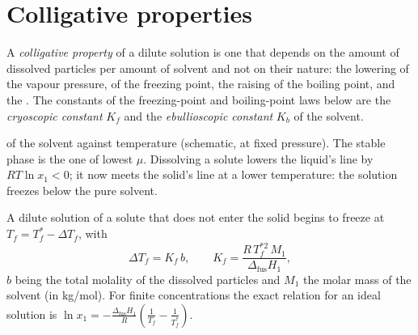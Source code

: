 \section{Colligative properties}

\begin{definition}\label{def:b2:chemical-potential:colligative}
A \emph{colligative property} of a dilute
solution is one that depends on the amount of dissolved particles per
amount of solvent and not on their nature: the lowering of the vapour
pressure, of the freezing point, the raising of the boiling point, and the
. The constants of the freezing-point and boiling-point laws
below are the \emph{cryoscopic constant} $K_f$
and the \emph{ebullioscopic constant} $K_b$ of
the solvent.
\end{definition}

\begin{omfigure}

{\small {} of the solvent against temperature (schematic,
at fixed pressure). The stable phase is the one of lowest $\mu$. Dissolving a
solute lowers the liquid's line by $RT\ln x_1 < 0$; it now meets the solid's
line at a lower temperature: the solution freezes below the pure solvent.}
\end{omfigure}

\begin{theorem}\label{thm:b2:chemical-potential:cryoscopy}
A dilute solution of a solute that does not enter the solid begins to freeze
at $T_f = T_f^* - \Delta T_f$, with
\[
  \Delta T_f = K_f\,b, \qquad K_f = \frac{R\,T_f^{*2}\,M_1}{\Delta_{\text{fus}}H_1} ,
\]
$b$ being the total molality of the dissolved particles and $M_1$ the molar
mass of the solvent (in \unit{kg/mol}). For finite concentrations the exact
relation for an ideal solution is $\ln x_1 = -\frac{\Delta_{\text{fus}}H_1}{R}
\left(\frac{1}{T_f} - \frac{1}{T_f^*}\right)$.
\end{theorem}

